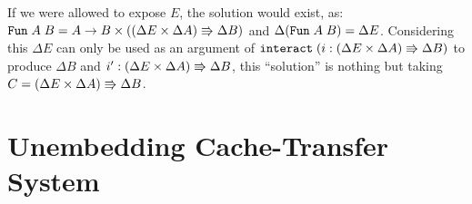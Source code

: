 \documentclass{article}
\theoremstyle{definition}
\begin{document}
If we were allowed to expose $E$, the solution would exist, as: 
$\texttt{Fun} \; A \; B = A \to B \times ((\Delta E \times \Delta A) \Rrightarrow \Delta B)$
and 
$\Delta (\texttt{Fun} \; A \; B) = \Delta E$. 
Considering this $\Delta E$ can only be used as an argument of $\texttt{interact} \; (i : (\Delta E \times \Delta A) \Rrightarrow \Delta B)$ to produce $\Delta B$ and $i' : (\Delta E \times \Delta A) \Rrightarrow \Delta B$, 
this ``solution'' is nothing but taking $C = (\Delta E \times \Delta A) \Rrightarrow \Delta B$. 


           




\section{Unembedding Cache-Transfer System}
\end{document}
